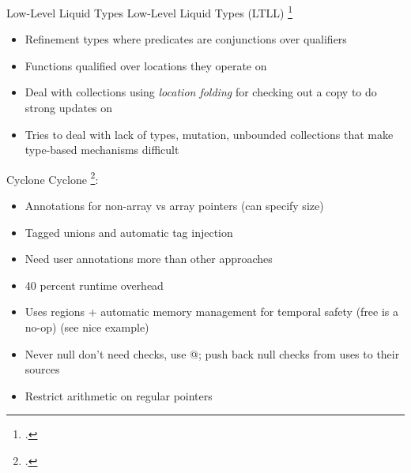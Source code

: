 \begin{frame}{Low-Level Liquid Types}
Low-Level Liquid Types (LTLL) \footcite{rondon_low-level_2010}
\begin{itemize}
    \item Refinement types where predicates are conjunctions over qualifiers
    \item Functions qualified over locations they operate on
    \item Deal with collections using \emph{location folding} for checking out a copy to do strong updates on
    \item Tries to deal with lack of types, mutation, unbounded collections that make type-based mechanisms difficult
\end{itemize}
\end{frame}

\begin{frame}{Cyclone}
Cyclone \footcite{jim_cyclone:_2002}: 
\begin{itemize}
    \item Annotations for non-array vs array pointers (can specify size) %
    \item Tagged unions and automatic tag injection
    \item Need user annotations more than other approaches
    \item 40 percent runtime overhead
    \item Uses regions + automatic memory management for temporal safety (free is a no-op) (see nice example)
    \item Never null don't need checks, use @; push back null checks from uses to their sources
    \item Restrict arithmetic on regular pointers
\end{itemize}
\end{frame}

